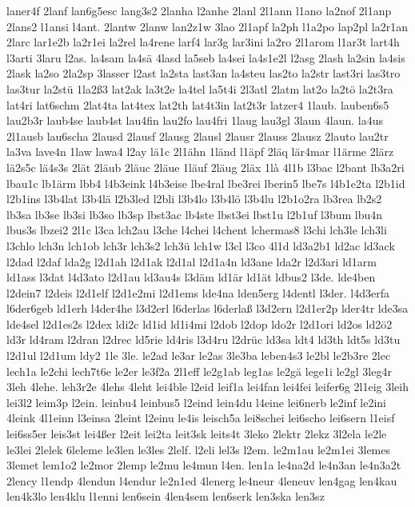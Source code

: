 {laner4f
2lanf
lan6g5esc
lang3s2
2lanha
l2anhe
2lanl
2l1ann
l1ano
la2nof
2l1anp
2lans2
l1ansi
l4ant.
2lantw
2lanw
lan2z1w
3lao
2l1apf
la2ph
l1a2po
lap2pl
la2r1an
2larc
lar1e2b
la2r1ei
la2rel
la4rene
larf4
lar3g
lar3ini
la2ro
2l1arom
l1ar3t
lart4h
l3arti
3laru
l2as.
la4sam
la4sä
4lasd
la5seb
la4sei
la4s1e2l
l2asg
2lash
la2sin
la4sis
2lask
la2so
2la2sp
3lasser
l2ast
la2sta
last3an
la4steu
las2to
la2str
last3ri
las3tro
las3tur
la2stü
1la2ß3
lat2ak
la3t2e
la4tel
la5t4i
2l3atl
2latm
lat2o
la2tö
la2t3ra
lat4ri
lat6schm
2lat4ta
lat4tex
lat2th
lat4t3in
lat2t3r
latzer4
1laub.
lauben6s5
lau2b3r
laub4se
laub4st
lau4fin
lau2fo
lau4fri
1laug
lau3gl
3laun
4laun.
la4us
2l1ausb
lau6scha
2lausd
2lausf
2lausg
2lausl
2lausr
2lauss
2lausz
2lauto
lau2tr
la3va
lave4n
1law
lawa4
l2ay
lä1c
2l1ähn
1länd
l1äpf
2läq
lär4mar
l1ärme
2lärz
lä2s5c
lä4s3s
2lät
2läub
2läuc
2läue
1läuf
2läug
2läx
1là
4l1b
l3bac
l2bant
lb3a2ri
lbau1c
lb1ärm
lbb4
l4b3eink
l4b3eise
lbe4ral
lbe3rei
lberin5
lbe7s
l4b1e2ta
l2b1id
l2b1ins
l3b4lat
l3b4lä
l2b3led
l2bli
l3b4lo
l3b4lö
l3b4lu
l2b1o2ra
lb3rea
lb2s2
lb3sa
lb3se
lb3si
lb3so
lb3sp
lbst3ac
lb4ste
lbst3ei
lbst1u
l2b1uf
l3bum
lbu4n
lbus3s
lbzei2
2l1c
l3ca
lch2au
l3che
l4chei
l4chent
lchermas8
l3chi
lch3le
lch3li
l3chlo
lch3n
lch1ob
lch3r
lch3s2
lch3ü
lch1w
l3cl
l3co
4l1d
ld3a2b1
ld2ac
ld3ack
l2dad
l2daf
lda2g
l2d1ah
l2d1ak
l2d1al
l2d1a4n
ld3ane
lda2r
l2d3ari
ld1arm
ld1ass
l3dat
l4d3ato
l2d1au
ld3au4s
l3däm
ld1är
ld1ät
ldbus2
l3de.
lde4ben
l2dein7
l2deis
l2d1elf
l2d1e2mi
l2d1ems
lde4na
lden5erg
l4dentl
l3der.
l4d3erfa
l6der6geb
ld1erh
l4der4he
l3d2erl
l6derlas
l6derlaß
l3d2ern
l2d1er2p
lder4tr
lde3sa
lde4sel
l2d1es2s
l2dex
ldi2c
ld1id
ld1i4mi
l2dob
l2dop
ldo2r
l2d1ori
ld2os
ld2ö2
ld3r
ld4ram
l2dran
l2drec
ld5rie
ld4ris
l3d4ru
l2drüc
ld3sa
ldt4
ld3th
ldt5s
ld3tu
l2d1ul
l2d1um
ldy2
1le
3le.
le2ad
le3ar
le2as
3le3ba
leben4s3
le2bl
le2b3re
2lec
lech1a
le2chi
lech7t6e
le2er
le3f2a
2l1eff
le2g1ab
leg1as
le2gä
lege1i
le2gl
3leg4r
3leh
4lehe.
leh3r2e
4lehs
4leht
lei4ble
l2eid
leif1a
lei4fan
lei4fei
leifer6g
2l1eig
3leih
lei3l2
leim3p
l2ein.
leinbu4
leinbus5
l2eind
lein4du
l4eine
lei6nerb
le2inf
le2ini
4leink
4l1einn
l3einsa
2leint
l2einu
le4is
leisch5a
lei8schei
lei6scho
lei6sern
l1eisf
lei6ss5er
leis3st
lei4ßer
l2eit
lei2ta
leit3sk
leits4t
3leko
2lektr
2lekz
3l2ela
le2le
le3lei
2lelek
6leleme
le3len
le3les
2lelf.
l2eli
lel3s
l2em.
le2m1au
le2m1ei
3lemes
3lemet
lem1o2
le2mor
2lemp
le2mu
le4mun
l4en.
len1a
le4na2d
le4n3an
le4n3a2t
2lency
l1endp
4lendun
l4endur
le2n1ed
4lenerg
le4neur
4leneuv
len4gag
len4kau
len4k3lo
len4klu
l1enni
len6sein
4len4sem
len6serk
len3ska
len3sz
}

